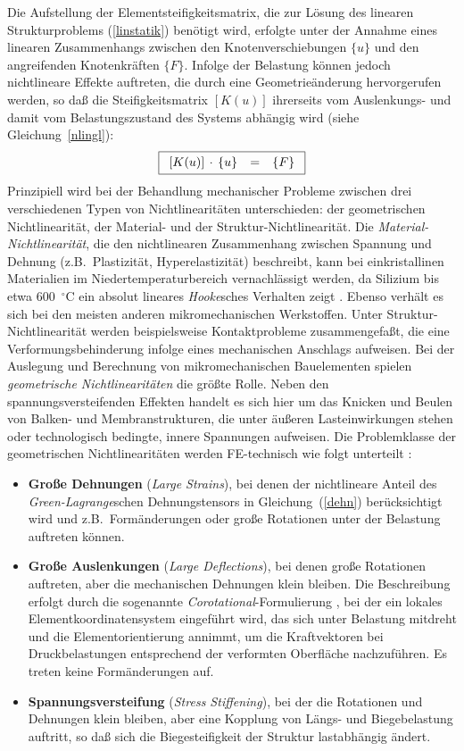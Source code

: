 Die Aufstellung der Elementsteifigkeitsmatrix, die zur Lösung des linearen
Strukturproblems (\ref{linstatik}) benötigt wird, erfolgte unter der Annahme
eines linearen Zusammenhangs zwischen den Knotenverschiebungen $\{u\}$ und
den angreifenden Knotenkräften $\{F\}$. Infolge der Belastung können jedoch
nichtlineare Effekte auftreten, die durch eine
Geometrieänderung hervorgerufen werden, so daß die Steifigkeitsmatrix
$[K(u)]$ ihrerseits vom Auslenkungs- und damit vom Belastungszustand des
Systems abhängig wird (siehe Gleichung~\ref{nlingl}):
\begin{equation}
\label{nlstatik}
\fbox{$
 \displaystyle
 \begin{array}{rcl}
 [K(u)] \, \cdot \, \{u\} & = & \{F\}
 \end{array}
 $}
\end{equation}
Prinzipiell wird bei der Behandlung mechanischer Probleme
zwischen drei verschiedenen Typen von
Nichtlinearitäten unterschieden: der geometrischen Nichtlinearität,
der Material- und der Struktur-Nichtlinearität. Die
{\em Material-Nichtlinearität}, die den nichtlinearen Zusammenhang zwischen
Spannung und Dehnung (z.B.\ Plastizität, Hyperelastizität) beschreibt,
kann bei
einkristallinen Materialien im Niedertemperaturbereich vernachlässigt
werden, da Silizium bis etwa 600~$^\circ$C ein absolut lineares
{\sl Hooke}sches Verhalten zeigt \cite{Ove77}.
Ebenso verhält es sich bei den
meisten anderen mikromechanischen Werkstoffen. Unter Struktur-Nichtlinearität
werden beispielsweise Kontaktprobleme zusammengefaßt, die eine
Verformungsbehinderung infolge eines mechanischen Anschlags aufweisen.
Bei der Auslegung und Berechnung von mikromechanischen Bauelementen spielen
{\em geometrische Nichtlinearitäten} die größte Rolle. Neben den
spannungsversteifenden Effekten handelt es sich hier um das Knicken und
Beulen von Balken- und Membranstrukturen, die unter äußeren Lasteinwirkungen
stehen oder technologisch bedingte, innere Spannungen aufweisen. Die
Problemklasse der geometrischen Nichtlinearitäten werden FE-technisch wie
folgt unterteilt \cite{Koh92}:
%
\begin{itemize}
\item
{\bf Große Dehnungen} ({\em Large Strains}),
bei denen der nichtlineare Anteil des {\sl Green-Lagrange}schen
Dehnungstensors in Gleichung~(\ref{dehn}) berücksichtigt wird und z.B.\
Formänderungen oder große Rotationen unter der Belastung auftreten können.
\item
{\bf Große Auslenkungen} ({\em Large Deflections}), bei denen große
Rotationen auftreten, aber die mechanischen Dehnungen klein bleiben.
Die Beschreibung erfolgt durch die sogenannte
{\em Corotational}-Formulierung \cite{Ran86}, bei der ein lokales
Elementkoordinatensystem eingeführt wird, das sich unter Belastung mitdreht
und die Element\-orientierung annimmt, um die Kraftvektoren bei
Druckbelastungen entsprechend der verformten Oberfläche nachzuführen.
Es treten keine Formänderungen auf.
\item
{\bf Spannungsversteifung} ({\em Stress Stiffening}), bei der die Rotationen
und Dehnungen klein bleiben, aber eine Kopplung von Längs- und
Biegebelastung auftritt, so daß sich die Biegesteifigkeit der Struktur
lastabhängig ändert.
\end{itemize}

